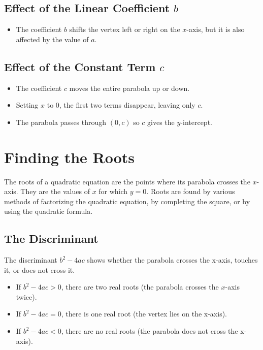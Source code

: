 \documentclass[12pt]{article}
\begin{document}
\subsection*{Effect of the Linear Coefficient \(b\)}
\begin{itemize}
\item The coefficient \(b\) shifts the vertex left or right on the $x$-axis, but it is also affected by the value of $a$.
\end{itemize}

\subsection*{Effect of the Constant Term \(c\)}
\begin{itemize}
    \item The coefficient \(c\) moves the entire parabola up or down.
    \item Setting $x$ to 0, the first two terms disappear, leaving only $c$.
    \item The parabola passes through $(0,c)$ so $c$ gives the $y$-intercept.
\end{itemize}

\newpage

\section*{Finding the Roots}
The roots of a quadratic equation are the points where its parabola crosses the $x$-axis. They are the values of \(x\) for which \(y = 0\). Roots are found by various methods of factorizing the quadratic equation, by completing the square, or by using the quadratic formula.

\subsection*{The Discriminant}
The discriminant \(b^2 - 4ac\) shows whether the parabola crosses the x-axis, touches it, or does not cross it.

\begin{itemize}
    \item If \(b^2-4ac > 0\), there are two real roots (the parabola crosses the $x$-axis twice).
    \item If \(b^2-4ac = 0\), there is one real root (the vertex lies on the x-axis).
    \item If \(b^2-4ac < 0\), there are no real roots (the parabola does not cross the x-axis).
\end{itemize}
\end{document}
